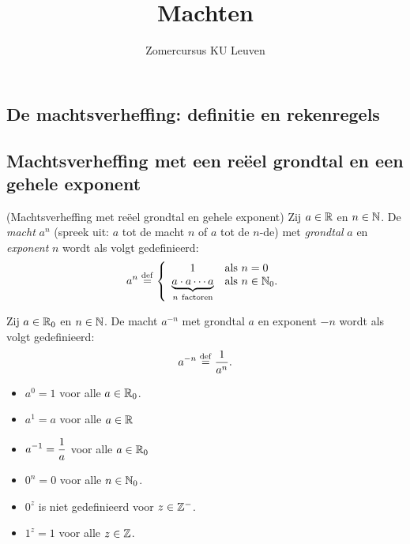 \documentclass{ximera}
\author{Zomercursus KU Leuven}
\title[Rekenvaardigheden:]{Machten}
\begin{document}
\begin{abstract}
	
\end{abstract}
\maketitle

\subsection{De machtsverheffing: definitie en rekenregels}
\subsection{Machtsverheffing met een re\"eel grondtal en een gehele exponent}
\begin{definition}(Machtsverheffing met re\"eel grondtal en gehele exponent)
	Zij $a\in\mathbb{R}$ en $n\in\mathbb{N}$. De \emph{macht} $a^n$ (spreek uit: $a$
	tot de macht $n$ of $a$ tot de $n$-de) met \emph{grondtal} $a$ en
	\emph{exponent} $n$ wordt als volgt gedefinieerd:
	\[a^n\overset{\mathrm{def}}{=}
	\left\{
	\begin{array}{cl}
	1 & \textrm{als }n=0 \\
	\underbrace{a\cdot a\cdots a}_{n\mathrm{\ factoren}} & \textrm{als }n\in\mathbb{N}_0. \\
	\end{array}
	\right.\]
	
	Zij $a\in\mathbb{R}_0$ en $n\in\mathbb{N}$. De macht $a^{-n}$ met grondtal $a$ en
	exponent $-n$ wordt als volgt gedefinieerd:
	\[a^{-n}\overset{\mathrm{def}}{=}\frac{1}{a^n}.\]
\end{definition}
\begin{example}
	\begin{itemize}
		\item $a^0=1$ voor alle $a\in\mathbb{R}_0$.
		\item $a^1=a$ voor alle $a\in\mathbb{R}$
		\item $\displaystyle a^{-1}=\frac{1}{a}$ voor alle $a\in\mathbb{R}_0$
		\item $0^n=0$ voor alle $n\in\mathbb{N}_0$.
		\item $0^z$ is niet gedefinieerd voor $z\in\mathbb{Z}^-$.
		\item $1^z=1$ voor alle $z\in\mathbb{Z}$.
	\end{itemize}
\end{example}
\end{document}
